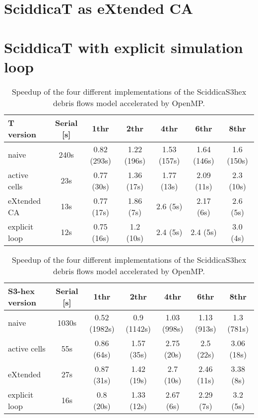 \section{SciddicaT as eXtended CA}


\section{SciddicaT with explicit simulation loop}


\begin{table}
  \centering
  \begin{tabular}{l|c|c|c|c|c|c}
    \hline
    T version & Serial [s] & 1thr & 2thr & 4thr & 6thr & 8thr\\
    \hline
    \hline
    naive         & 240s & 0.82 (293s) & 1.22 (196s) & 1.53 (157s) & 1.64 (146s) & 1.6 (150s)\\
    active cells  & 23s  & 0.77 (30s)  & 1.36 (17s)  & 1.77 (13s)  & 2.09 (11s)  & 2.3 (10s)\\
    eXtended CA   & 13s  & 0.77 (17s)  & 1.86 (7s)   & 2.6  (5s)   & 2.17  (6s)  & 2.6 (5s)\\
    explicit loop & 12s  & 0.75 (16s)  & 1.2  (10s)  & 2.4  (5s)   & 2.4  (5s)   & 3.0 (4s)\\
    \hline
  \end{tabular}
  \caption{Speedup of the four different
    implementations of the SciddicaS3hex debris flows model accelerated by OpenMP.}
  \label{tab:speedup}
\end{table} 

\begin{table}
  \centering
  \begin{tabular}{l|c|c|c|c|c|c}
    \hline
    S3-hex version & Serial [s] & 1thr & 2thr & 4thr & 6thr & 8thr\\
    \hline
    \hline
    naive         & 1030s & 0.52 (1982s) & 0.9 (1142s) & 1.03 (998s) & 1.13 (913s) & 1.3  (781s)\\
    active cells  & 55s   & 0.86 (64s)   & 1.57 (35s)  & 2.75 (20s)  & 2.5  (22s)  & 3.06 (18s)\\
    eXtended      & 27s   & 0.87 (31s)   & 1.42 (19s)  & 2.7  (10s)  & 2.46 (11s)  & 3.38 (8s)\\
    explicit loop & 16s   & 0.8  (20s)   & 1.33 (12s)  & 2.67 (6s)  & 2.29  (7s)   & 3.2  (5s)\\
    \hline
  \end{tabular}
  \caption{Speedup of the four different
    implementations of the SciddicaS3hex debris flows model accelerated by OpenMP.}
  \label{tab:speedup}
\end{table} 

